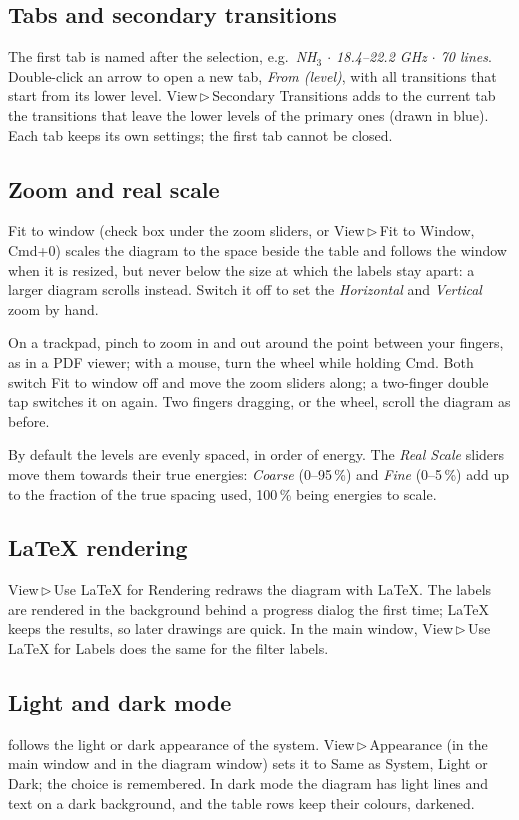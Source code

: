 \documentclass[11pt]{article}
\newcommand{\menu}[1]{\textsf{#1}}
\newcommand{\key}[1]{\textsf{#1}}
\newcommand{\then}{\,$\triangleright$\,}
\begin{document}
\subsection{Tabs and secondary transitions}
The first tab is named after the selection, e.g.\ \emph{NH$_3$ $\cdot$ 18.4--22.2 GHz $\cdot$ 70 lines}.
Double-click an arrow to open a new tab, \emph{From \textrm{(level)}}, with all transitions that start
from its lower level.
\menu{View\then Secondary Transitions} adds to the current tab the transitions that leave the
lower levels of the primary ones (drawn in blue). Each tab keeps its own settings; the first tab cannot be closed.

\subsection{Zoom and real scale}
\menu{Fit to window} (check box under the zoom sliders, or \menu{View\then Fit to Window},
\key{Cmd+0}) scales the diagram to the space beside the table and follows the window when it is
resized, but never below the size at which the labels stay apart: a larger diagram scrolls instead.
Switch it off to set the \emph{Horizontal} and \emph{Vertical} zoom by hand.

On a trackpad, pinch to zoom in and out around the point between your fingers, as in a PDF viewer;
with a mouse, turn the wheel while holding \key{Cmd}. Both switch \menu{Fit to window} off and move the
zoom sliders along; a two-finger double tap switches it on again. Two fingers dragging, or the wheel,
scroll the diagram as before.

By default the levels are evenly spaced, in order of energy. The \emph{Real Scale} sliders move
them towards their true energies: \emph{Coarse} (0--95\,\%) and \emph{Fine} (0--5\,\%) add up to
the fraction of the true spacing used, 100\,\% being energies to scale.

\subsection{\LaTeX{} rendering}\label{sec:latex}
\menu{View\then Use LaTeX for Rendering} redraws the diagram with \LaTeX{}. The labels are
rendered in the background behind a progress dialog the first time; \LaTeX{} keeps the results,
so later drawings are quick. In the main window, \menu{View\then Use LaTeX for Labels} does the
same for the filter labels.

\subsection{Light and dark mode}
\AppName{} follows the light or dark appearance of the system. \menu{View\then Appearance} (in the main
window and in the diagram window) sets it to \menu{Same as System}, \menu{Light} or \menu{Dark}; the
choice is remembered. In dark mode the diagram has light lines and text on a dark background, and the
table rows keep their colours, darkened.
\end{document}

